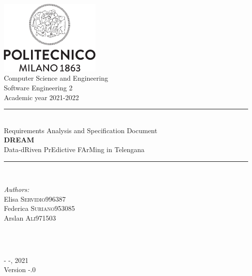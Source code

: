 \documentclass[a4paper,11pt]{report}
\begin{document}
\begin{titlepage}

\newcommand{\HRule}{\rule{\linewidth}{0.1mm}}

\center 

\includegraphics[width=50mm,scale=0.5]{./Images/Logo_Politecnico_Milano.png}\\[0.5cm] 

{\Large Computer Science and Engineering}\\[0.4cm] 
{\large Software Engineering 2}\\[0.4cm] 
{\large Academic year 2021-2022}\\[0.5cm] 

\HRule \\[1.5 cm]
{\LARGE Requirements Analysis and Specification Document} \\[1cm]
{\textbf {\Huge DREAM}}\\[0.3cm] 
{\LARGE Data-dRiven PrEdictive FArMing in Telengana} \\[1cm]
\HRule \\[1.5cm]
\raggedright

\begin{minipage}{0.55\textwidth}
\begin{flushleft} \large
\emph{Authors:}\\
Elisa \textsc{Servidio}\hfill 996387 \\
Federica \textsc{Suriano}\hfill 953085 \\
Arslan \textsc{Ali}\hfill 971503 \\
\end{flushleft}
\end{minipage}\\[1 cm]
~

\center

{\large - -, 2021}\\[0.3 cm]
{\large Version -.0}\\

\vfill 
\end{titlepage}

\newpage

\tableofcontents
{}
\listoftables
\newpage
\listoffigures
\newpage







\end{document}
